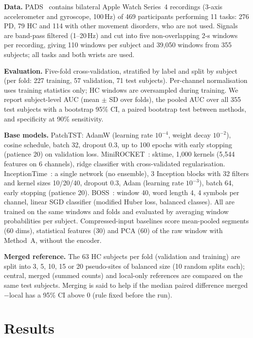 \documentclass{article}
\begin{document}
\textbf{Data.} PADS~\cite{varghese2024pads} contains bilateral Apple Watch Series~4 recordings (3-axis accelerometer and gyroscope, 100\,Hz) of 469 participants performing 11 tasks: 276 PD, 79 HC and 114 with other movement disorders, who are not used. Signals are band-pass filtered (1--20\,Hz) and cut into five non-overlapping 2-s windows per recording, giving 110 windows per subject and 39{,}050 windows from 355 subjects; all tasks and both wrists are used.

\textbf{Evaluation.} Five-fold cross-validation, stratified by label and split by subject (per fold: 227 training, 57 validation, 71 test subjects). Per-channel normalisation uses training statistics only; HC windows are oversampled during training. We report subject-level AUC (mean $\pm$ SD over folds), the pooled AUC over all 355 test subjects with a bootstrap 95\% CI, a paired bootstrap test between methods, and specificity at 90\% sensitivity.

\textbf{Base models.} PatchTST: AdamW (learning rate $10^{-4}$, weight decay $10^{-2}$), cosine schedule, batch 32, dropout 0.3, up to 100 epochs with early stopping (patience 20) on validation loss. MiniROCKET~\cite{dempster2021minirocket}: sktime, 1{,}000 kernels (5{,}544 features on 6 channels), ridge classifier with cross-validated regularisation. InceptionTime~\cite{ismail2020inceptiontime}: a single network (no ensemble), 3 Inception blocks with 32 filters and kernel sizes 10/20/40, dropout 0.3, Adam (learning rate $10^{-3}$), batch 64, early stopping (patience 20). BOSS~\cite{schafer2015boss}: window 40, word length 4, 4 symbols per channel, linear SGD classifier (modified Huber loss, balanced classes). All are trained on the same windows and folds and evaluated by averaging window probabilities per subject. Compressed-input baselines score mean-pooled segments (60 dims), statistical features (30) and PCA (60) of the raw window with Method~A, without the encoder.

\textbf{Merged reference.} The 63 HC subjects per fold (validation and training) are split into 3, 5, 10, 15 or 20 pseudo-sites of balanced size (10 random splits each); central, merged (summed counts) and local-only references are compared on the same test subjects. Merging is said to help if the median paired difference merged$-$local has a 95\% CI above 0 (rule fixed before the run).

\section{Results}
\label{sec:results}
\end{document}

